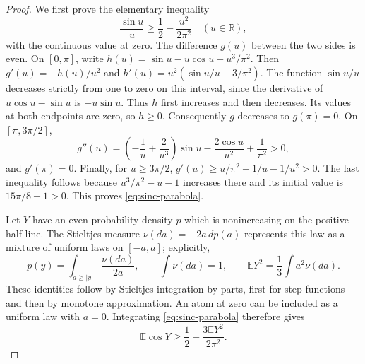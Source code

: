 \begin{proof}
We first prove the elementary inequality
\begin{equation}
 \frac{\sin u}{u}\ge\frac12-\frac{u^2}{2\pi^2}
 \quad (u\in\mathbb R),
 \label{eq:sinc-parabola}
\end{equation}
with the continuous value at zero.  The difference $g(u)$ between the
two sides is even.  On $[0,\pi]$, write
$h(u)=\sin u-u\cos u-u^3/\pi^2$.  Then
$g'(u)=-h(u)/u^2$ and
$h'(u)=u^2(\sin u/u-3/\pi^2)$.  The function $\sin u/u$ decreases
strictly from one to zero on this interval, since the derivative of
$u\cos u-\sin u$ is $-u\sin u$.  Thus $h$ first increases and then
decreases.  Its values at both endpoints are zero, so $h\ge0$.
Consequently $g$ decreases to $g(\pi)=0$.  On $[\pi,3\pi/2]$,
\[
 g''(u)=\left(-\frac1u+\frac2{u^3}\right)\sin u
              -\frac{2\cos u}{u^2}+\frac1{\pi^2}>0,
\]
and $g'(\pi)=0$.  Finally, for $u\ge3\pi/2$,
$g'(u)\ge u/\pi^2-1/u-1/u^2>0$.  The last inequality follows because
$u^3/\pi^2-u-1$ increases there and its initial value is
$15\pi/8-1>0$.  This proves \eqref{eq:sinc-parabola}.

Let $Y$ have an even probability density $p$ which is nonincreasing on
the positive half-line.  The Stieltjes measure
$\nu(da)=-2a\,dp(a)$ represents this law as a mixture of uniform laws on
$[-a,a]$; explicitly,
\[
 p(y)=\int_{a\ge |y|}\frac{\nu(da)}{2a},\qquad
 \int\nu(da)=1,
 \qquad
 \mathbb E Y^2=\frac13\int a^2\nu(da).
\]
These identities follow by Stieltjes integration by parts, first for
step functions and then by monotone approximation.  An atom at zero
can be included as a uniform law with $a=0$.  Integrating
\eqref{eq:sinc-parabola} therefore gives
\begin{equation}
 \mathbb E\cos Y\ge\frac12-\frac{3\mathbb E Y^2}{2\pi^2}.
 \label{eq:unimodal-cosine-bound}
\end{equation}


\end{proof}
